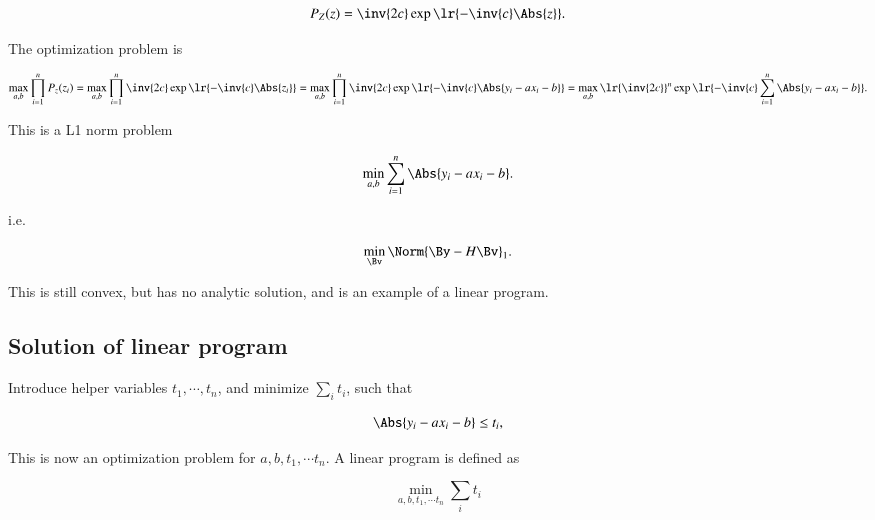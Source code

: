 \begin{dmath}\label{eqn:L1introduction:460}
P_Z(z) = \inv{2 c} \exp\lr{ -\inv{c} \Abs{z} }.
\end{dmath}


The optimization problem is

\begin{dmath}\label{eqn:L1introduction:480}
\max_{a,b} \prod_{i = 1}^n P_z(z_i)
=
\max_{a,b} \prod_{i = 1}^n
\inv{2 c} \exp\lr{ -\inv{c} \Abs{z_i} }
=
\max_{a,b} \prod_{i = 1}^n
\inv{2 c} \exp\lr{ -\inv{c} \Abs{y_i - a x_i - b} }
=
\max_{a,b}
\lr{\inv{2 c}}^n \exp\lr{ -\inv{c} \sum_{i=1}^n \Abs{y_i - a x_i - b} }.
\end{dmath}

This is a L1 norm problem

\begin{dmath}\label{eqn:L1introduction:500}
\min_{a,b} \sum_{i = 1}^n \Abs{ y_i - a x_i - b }.
\end{dmath}

i.e.

\begin{dmath}\label{eqn:L1introduction:520}
\min_\Bv \Norm{ \By - H \Bv }_1.
\end{dmath}

This is still convex, but has no analytic solution, and is an example of a linear program.

\subsection{Solution of linear program}

Introduce helper variables \( t_1, \cdots, t_n \), and
minimize \( \sum_i t_i \), such that

\begin{dmath}\label{eqn:L1introduction:540}
\Abs{ y_i - a x_i - b } \le t_i,
\end{dmath}

This is now an optimization problem for \( a, b, t_1, \cdots t_n \).  A linear program is defined as

\begin{dmath}\label{eqn:L1introduction:560}
\min_{a, b, t_1, \cdots t_n} \sum_i t_i
\end{dmath}

